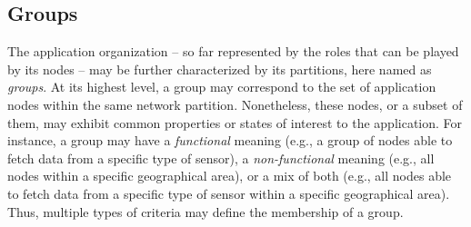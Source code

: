 


\subsection{Groups}









The application organization -- so far represented by the roles that can be played by its nodes -- may be further characterized by its partitions, here named as \textit{groups}. 
At its highest level, a group may correspond to the set of application nodes within the same network partition. Nonetheless, these nodes, or a subset of them, may exhibit common properties or states of interest to the application. For instance, a group may have a \textit{functional} meaning (e.g., a group of nodes able to fetch data from a specific type of sensor), a \textit{non-functional} meaning (e.g., all nodes within a specific geographical area), or a mix of both (e.g., all nodes able to fetch data from a specific type of sensor within a specific geographical area). Thus, multiple types of criteria may define the membership of a group.

